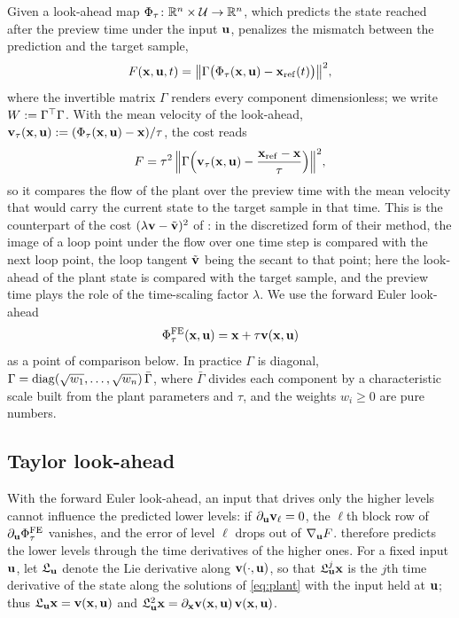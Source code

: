 Given a look-ahead map $\Phi_\tau\colon \R^n\times\mathcal{U}\to\R^n$, which predicts the state reached
after the preview time under the input $\bu$, \method{} penalizes the mismatch between the
prediction and the target sample,
\begin{equation}\label{eq:cost}
    F(\bx,\bu,t) = \norm[\big]{\Gamma\bigl(\Phi_\tau(\bx,\bu) - \bxref(t)\bigr)}^2,
\end{equation}
where the invertible matrix $\Gamma$ renders every component dimensionless; we write
$W := \Gamma^\T\Gamma$.
With the mean velocity of the look-ahead, $\bv_\tau(\bx,\bu) := (\Phi_\tau(\bx,\bu) - \bx)/\tau$, the
cost reads
\begin{equation}\label{eq:cost-flow}
    F = \tau^2\,\norm[\Big]{\Gamma\Bigl(\bv_\tau(\bx,\bu) - \frac{\bxref - \bx}{\tau}\Bigr)}^2 ,
\end{equation}
so it compares the flow of the plant over the preview time with the mean velocity that would carry
the current state to the target sample in that time.
This is the counterpart of the cost $(\lambda\bv - \tilde{\bv})^2$ of \citet{lan2004variational}: in
the discretized form of their method, the image of a loop point under the flow over one time step is
compared with the next loop point, the loop tangent $\tilde{\bv}$ being the secant to that point; here
the look-ahead of the plant state is compared with the target sample, and the preview time plays the
role of the time-scaling factor $\lambda$.
We use the forward Euler look-ahead
\begin{equation}\label{eq:fe}
    \Phi_\tau^{\mathrm{FE}}(\bx,\bu) = \bx + \tau\bv(\bx,\bu)
\end{equation}
as a point of comparison below.
In practice $\Gamma$ is diagonal, $\Gamma = \diag(\sqrt{w_1},\dots,\sqrt{w_n})\,\bar\Gamma$, where
$\bar\Gamma$ divides each component by a characteristic scale built from the plant parameters and
$\tau$, and the weights $w_i \ge 0$ are pure numbers.

\subsection{Taylor look-ahead}\label{sec:lookahead}

With the forward Euler look-ahead, an input that drives only the higher levels cannot influence the
predicted lower levels: if $\partial_{\bu}\bv_\ell = 0$, the $\ell$th block row of
$\partial_{\bu}\Phi_\tau^{\mathrm{FE}}$ vanishes, and the error of level $\ell$ drops out of
$\nabla_{\bu}F$.
\method{} therefore predicts the lower levels through the time derivatives of the higher ones.
For a fixed input $\bu$, let $\mathfrak{L}_{\bu}$ denote the Lie derivative along $\bv(\cdot,\bu)$, so
that $\mathfrak{L}_{\bu}^j\bx$ is the $j$th time derivative of the state along the solutions of
\eqref{eq:plant} with the input held at $\bu$; thus $\mathfrak{L}_{\bu}\bx = \bv(\bx,\bu)$ and
$\mathfrak{L}_{\bu}^2\bx = \partial_{\bx}\bv(\bx,\bu)\,\bv(\bx,\bu)$.

